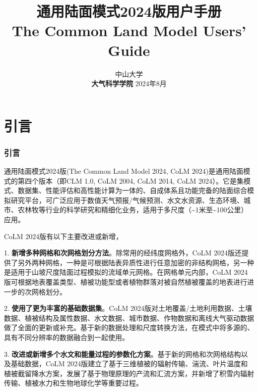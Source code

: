 \documentclass[a4paper,12pt,twoside]{article}
\begin{document}
\title{\huge {\bf 通用陆面模式2024版用户手册}\\
\vspace{6mm}
\fontsize {22}{24}
\bf{ The Common Land Model Users' Guide}
\fontsize {20}{23}
 \vskip 2in
}

\author{
 \large{ 中山大学 }\\[2ex]
 {\bf 大气科学学院}
 \vskip 2in
 \upshape
 \large
 \vskip 0.5in
 2024年8月
}

\normallinespacing
\maketitle

\preface

\clearpage 
\pagestyle{fancy}

\tableofcontents
\clearpage
{}

\part{引言}
\section{引言}

通用陆面模式2024版(The Common Land Model 2024, CoLM 2024)是通用陆面模式的第四个版本（即CLM 1.0, CoLM 2004, CoLM 2014, CoLM 2024）。它是集模式、数据集、性能评估和高性能计算为一体的、自成体系且功能完备的陆面综合模拟研究平台，可广泛应用于数值天气预报/气候预测、水文水资源、生态环境、城市、农林牧等行业的科学研究和精细化业务，适用于多尺度（\textasciitilde 1米至\textasciitilde 100公里）应用。

CoLM 2024版有以下主要改进或新增，

1. \textbf{新增多种网格和次网格划分方法}。除常用的经纬度网格外，CoLM 2024版还提供了另外两种网格，一种是可根据陆表异质性进行任意加密的非结构网格，另一种是适用于山坡尺度陆面过程模拟的流域单元网格。在网格单元内部，CoLM 2024版可根据地表覆盖类型、植被功能型或者植物群落对被自然植被覆盖的地表进行进一步的次网格划分。

2. \textbf{使用了更为丰富的基础数据集}。CoLM 2024版对土地覆盖/土地利用数据、土壤数据、植被结构及属性数据、水文数据、城市数据、作物数据和离线大气驱动数据做了全面的更新或补充。基于新的数据处理和尺度转换方法，在模式中将多源的、具有不同分辨率的数据融合到一起使用。

3. \textbf{改进或新增多个水文和能量过程的参数化方案}。基于新的网格和次网格结构以及基础数据，CoLM 2024版建立了基于三维植被的辐射传输、湍流、叶片温度和植被截留降水方案，发展了基于物理原理的产流和汇流方案，并新增了积雪内辐射传输、植被水力和生物地球化学等重要过程。
\end{document}
